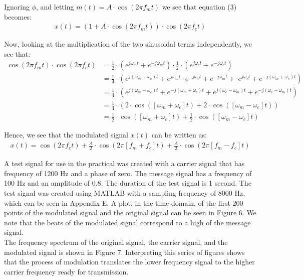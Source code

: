 \documentclass{article}
\begin{document}
Ignoring $\phi$, and letting $m(t) = A \cdot \cos (2 \pi f_m t)$ we see that equation (3) becomes:
\begin{align*}
	x(t) = (1 + A \cdot \cos (2 \pi f_m t)) \cdot \cos (2 \pi f_c t)
\end{align*}

Now, looking at the multiplication of the two sinusoidal terms independently, we see that:
\begin{align*}
	\cos (2 \pi f_m t) \cdot \cos (2 \pi f_c t) &= \frac{1}{2} \cdot (e^{j \omega_m t} + e^{-j \omega_m t}) \cdot \frac{1}{2} \cdot (e^{j \omega_c t} + e^{-j \omega_c t})\\
												&= \frac{1}{4} \cdot (e^{j (\omega_m + \omega_c) t} + e^{j \omega_m t} \cdot e^{-j \omega_c t} + e^{-j \omega_m t} + \cdot e^{j \omega_c t} + e^{-j (\omega_m + \omega_c) t})\\
												&= \frac{1}{4} \cdot (e^{j (\omega_m + \omega_c) t} + e^{-j (\omega_m + \omega_c) t} + e^{j (\omega_c - \omega_m)t} + e^{-j (\omega_c - \omega_m)t})\\
												&= \frac{1}{4} \cdot (2 \cdot \cos ([\omega_m + \omega_c]t) + 2 \cdot \cos ([\omega_m - \omega_c]t))\\
												&= \frac{1}{2} \cdot \cos ([\omega_m + \omega_c]t) + \frac{1}{2} \cdot \cos ([\omega_m - \omega_c]t)
\end{align*}

Hence, we see that the modulated signal $x(t)$ can be written as:
\begin{align*}
	x(t) = \cos (2 \pi f_c t) + \frac{A}{2} \cdot \cos (2 \pi [f_m + f_c]t) + \frac{A}{2} \cdot \cos (2 \pi [f_m - f_c]t)
\end{align*}

A test signal for use in the practical was created with a carrier signal that has frequency of 1200 $\si{\hertz}$ and a phase of zero. The message signal has a frequency of 100 $\si{\hertz}$ and an amplitude of 0.8. The duration of the test signal is 1 second. The test signal was created using MATLAB with a sampling frequency of 8000 $\si{\hertz}$, which can be seen in Appendix E. A plot, in the time domain, of the first 200 points of the modulated signal and the original signal can be seen in Figure 6. We note that the beats of the modulated signal correspond to a high of the message signal.\\

The frequency spectrum of the original signal, the carrier signal, and the modulated signal is shown in Figure 7. Interpreting this series of figures shows that the process of modulation translates the lower frequency signal to the higher carrier frequency ready for transmission.
\end{document}
